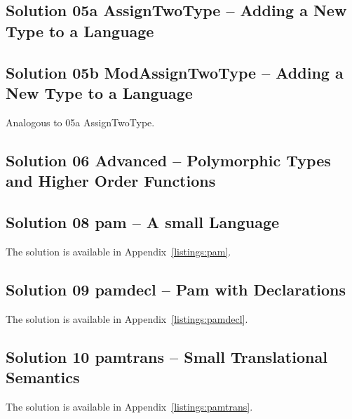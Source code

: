 \documentclass[10.5pt,a4]{article}
\begin{document}
\subsection{Solution 05a AssignTwoType – Adding a New Type to a Language}


\subsection{Solution 05b ModAssignTwoType – Adding a New Type to a Language}
Analogous to 05a AssignTwoType.

\subsection{Solution 06 Advanced – Polymorphic Types and Higher Order Functions}


\subsection{Solution 08 pam – A small Language}
The solution is available in Appendix~\ref{listings:pam}.

\subsection{Solution 09 pamdecl – Pam with Declarations}
The solution is available in Appendix~\ref{listings:pamdecl}.

\subsection{Solution 10 pamtrans – Small Translational Semantics}
The solution is available in Appendix~\ref{listings:pamtrans}.

\end{document}
